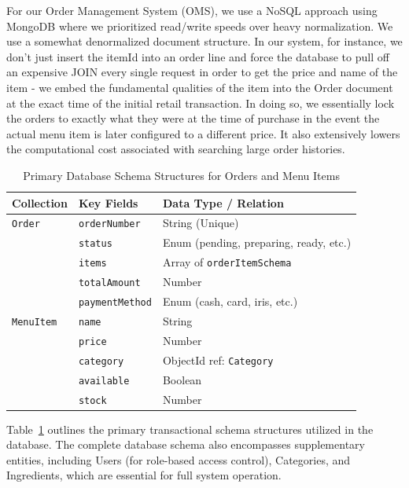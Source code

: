 For our Order Management System (OMS), we use a NoSQL approach using MongoDB \cite{banker2011mongodb} where we prioritized read/write speeds over heavy normalization. We use a somewhat denormalized document structure. In our system, for instance, we don't just insert the itemId into an order line and force the database to pull off an expensive JOIN every single request in order to get the price and name of the item - we embed the fundamental qualities of the item into the Order document at the exact time of the initial retail transaction. In doing so, we essentially lock the orders to exactly what they were at the time of purchase in the event the actual menu item is later configured to a different price. It also extensively lowers the computational cost associated with searching large order histories.

\begin{table}[htbp]
\centering
\caption{Primary Database Schema Structures for Orders and Menu Items}
\label{tab:schemas}
\begin{tabular}{@{}lll@{}}
\toprule
\textbf{Collection} & \textbf{Key Fields} & \textbf{Data Type / Relation} \\ \midrule
\texttt{Order} & \texttt{orderNumber} & String (Unique) \\
 & \texttt{status} & Enum (pending, preparing, ready, etc.) \\
 & \texttt{items} & Array of \texttt{orderItemSchema} \\
 & \texttt{totalAmount} & Number \\
 & \texttt{paymentMethod} & Enum (cash, card, iris, etc.) \\ \midrule
\texttt{MenuItem} & \texttt{name} & String \\
 & \texttt{price} & Number \\
 & \texttt{category} & ObjectId ref: \texttt{Category} \\
 & \texttt{available} & Boolean \\
 & \texttt{stock} & Number \\ \bottomrule
\end{tabular}
\end{table}

Table~\ref{tab:schemas} outlines the primary transactional schema structures utilized in the database. The complete database schema also encompasses supplementary entities, including Users (for role-based access control), Categories, and Ingredients, which are essential for full system operation.

